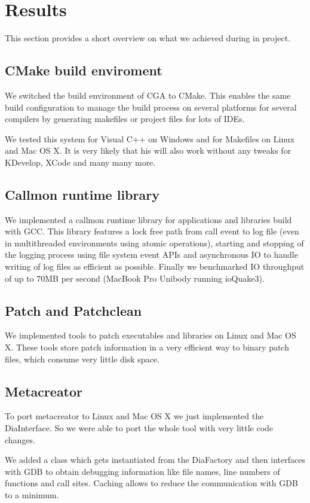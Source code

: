 \section{Results} This section provides a short overview on what we achieved during in project.

\subsection{CMake build enviroment} We switched the build environment of CGA to CMake. This enables the same build configuration  to manage the build process on several platforms for several compilers by generating makefiles or project files  for lots of IDEs.

We tested this system for Visual C++ on Windows and for Makefiles on Linux and Mac OS X. It is very likely that his will also work without any tweaks for KDevelop, XCode and many many more. 

\subsection{Callmon runtime library} We implemented a callmon runtime library for applications and libraries build with GCC. This library features a lock free path from call event to log file (even in multithreaded environments using atomic operations), starting and stopping of the logging process using file system event APIs and asynchronous IO to handle writing of log files as efficient as possible. Finally we benchmarked IO throughput of up to 70MB per second (MacBook Pro Unibody running ioQuake3).

\subsection{Patch and Patchclean} We implemented tools to patch executables and libraries on Linux and Mac OS X. These tools store patch information in a very efficient way to binary patch files, which consume very little disk space.

\subsection{Metacreator} To port metacreator to Linux and Mac OS X we just implemented the DiaInterface. So we were able to port the whole tool with very little code changes. 

We added a class which gets instantiated from the DiaFactory and then interfaces with GDB to obtain debugging information like file names, line numbers of functions and call sites. Caching allows to reduce the communication with GDB to a minimum.

